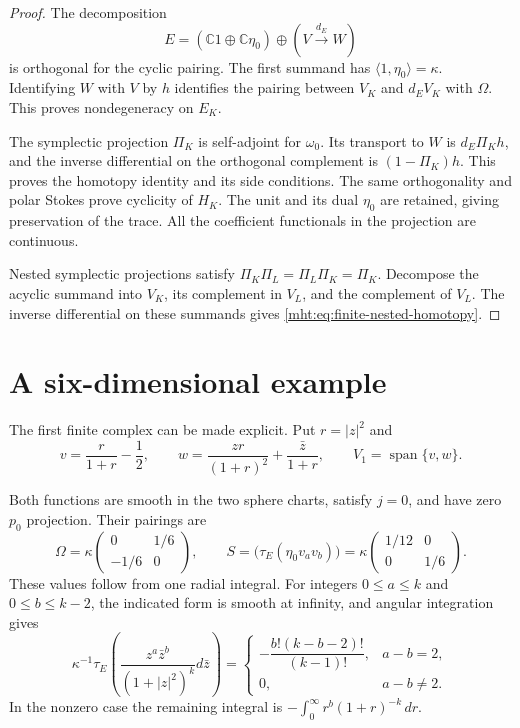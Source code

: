 \begin{proof}
The decomposition
\[
 E=(\mathbb C1\oplus\mathbb C\eta_0)
      \oplus(V\xrightarrow{d_E}W)
\]
is orthogonal for the cyclic pairing. The first summand has
$\langle1,\eta_0\rangle=\kappa$. Identifying $W$ with $V$ by $h$
identifies the pairing between $V_K$ and $d_EV_K$ with $\Omega$.
This proves nondegeneracy on $E_K$.

The symplectic projection $\Pi_K$ is self-adjoint for $\omega_0$.
Its transport to $W$ is $d_E\Pi_Kh$, and the inverse differential
on the orthogonal complement is $(1-\Pi_K)h$. This proves the
homotopy identity and its side conditions. The same orthogonality
and polar Stokes prove cyclicity of $H_K$. The unit and its dual
$\eta_0$ are retained, giving preservation of the trace. All the
coefficient functionals in the projection are continuous.

Nested symplectic projections satisfy
$\Pi_K\Pi_L=\Pi_L\Pi_K=\Pi_K$. Decompose the acyclic summand
into $V_K$, its complement in $V_L$, and the complement of $V_L$.
The inverse differential on these summands gives
\eqref{mht:eq:finite-nested-homotopy}.
\end{proof}

\section{A six-dimensional example}

The first finite complex can be made explicit. Put $r=|z|^2$ and
\begin{equation}\label{mht:eq:finite-two-modes}
 v=\frac r{1+r}-\frac12,
 \qquad w=\frac{zr}{(1+r)^2}+\frac{\bar z}{1+r},
 \qquad V_1=\operatorname{span}\{v,w\}.
\end{equation}

Both functions are smooth in the two sphere charts, satisfy $j=0$,
and have zero $p_0$ projection. Their pairings are
\begin{equation}\label{mht:eq:finite-two-pairings}
 \Omega=\kappa\begin{pmatrix}0&1/6\\-1/6&0\end{pmatrix},
 \qquad
 S=\bigl(\tau_E(\eta_0v_av_b)\bigr)
       =\kappa\begin{pmatrix}1/12&0\\0&1/6\end{pmatrix}.
\end{equation}
These values follow from one radial integral. For integers
$0\leq a\leq k$ and $0\leq b\leq k-2$, the indicated form is smooth
at infinity, and angular integration gives
\begin{equation}\label{mht:eq:finite-radial-moment}
 \kappa^{-1}\tau_E\left(
      \frac{z^a\bar z^b}{(1+|z|^2)^k}d\bar z\right)
 =\begin{cases}
 -\dfrac{b!(k-b-2)!}{(k-1)!},&a-b=2,\\
 0,&a-b\ne2.
 \end{cases}
\end{equation}
In the nonzero case the remaining integral is
$-\int_0^\infty r^b(1+r)^{-k}\,dr$.

